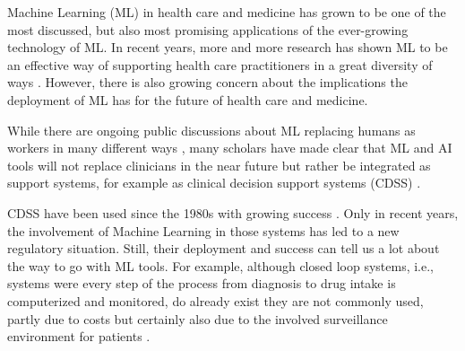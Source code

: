 Machine Learning (ML) in health care and medicine has grown to be one of the most discussed, but also most promising applications of the ever-growing technology of ML.
In recent years, more and more research has shown ML to be an effective way of supporting health care practitioners in a great diversity of ways \cite{rajpurkar2022ai, topol2019high}.
However, there is also growing concern about the implications the deployment of ML has for the future of health care and medicine. 

While there are ongoing public discussions about ML replacing humans as workers in many different ways , many scholars have made clear that ML and AI tools will not replace clinicians in the near future but rather be integrated as support systems, for example as clinical decision support systems (CDSS) \cite{Morley2020}.

CDSS have been used since the 1980s with growing success \cite{sutton2020overview}.
Only in recent years, the involvement of Machine Learning in those systems has led to a new regulatory situation.
Still, their deployment and success can tell us a lot about the way to go with ML tools.
For example, although closed loop systems, i.e., systems were every step of the process from diagnosis to drug intake is computerized and monitored, do already exist they are not commonly used, partly due to costs but certainly also due to the involved surveillance environment for patients \cite{sutton2020overview}. 


